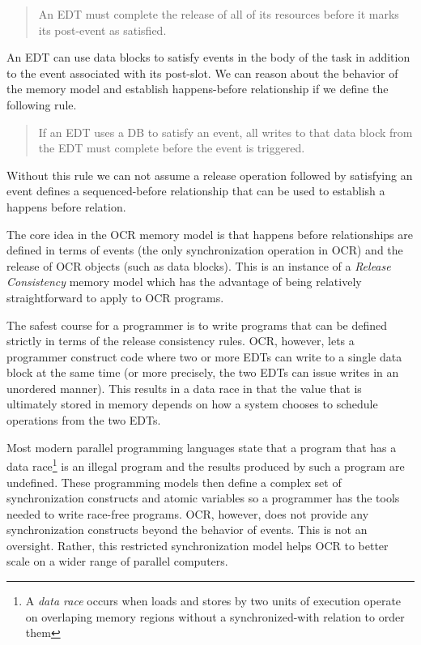 \begin{quote}
An EDT must complete the release of all of its resources before it
marks its post-event as satisfied.
\end{quote}

An EDT can use data blocks to satisfy events in the body of the task
in addition to the event associated with its post-slot. We can reason
about the behavior of the memory model and establish happens-before
relationship if we define the following rule.

\begin{quote}
If an EDT uses a DB to satisfy an event, all writes to that data block
from the EDT must complete before the event is triggered.
\end{quote}

Without this rule we can not assume a release operation followed by
satisfying an event defines a sequenced-before relationship that can
be used to establish a happens before relation.

The core idea in the OCR memory model is that happens before
relationships are defined in terms of events (the only synchronization
operation in OCR) and the release of OCR objects (such as data
blocks). This is an instance of a \emph{Release
Consistency} memory model which has the
advantage of being relatively straightforward to apply to OCR
programs.

The safest course for a programmer is to write programs that can be
defined strictly in terms of the release consistency rules. OCR,
however, lets a programmer construct code where two or more EDTs can
write to a single data block at the same time (or more precisely, the
two EDTs can issue writes in an unordered manner). This results in a
data race in that the value that is ultimately stored
in memory depends on how a system chooses to schedule operations from
the two EDTs.

Most modern parallel programming languages state that a program that
has a data race\footnote{A \emph{data race} occurs when loads and
stores by two units of execution operate on overlaping memory regions
without a synchronized-with relation to order them} is an illegal
program and the results produced by such a program are undefined.
These programming models then define a complex set of synchronization
constructs and atomic variables so a programmer has the tools needed
to write race-free programs. OCR, however, does not provide any
synchronization constructs beyond the behavior of events. This is not
an oversight. Rather, this restricted synchronization model helps OCR
to better scale on a wider range of parallel computers.


